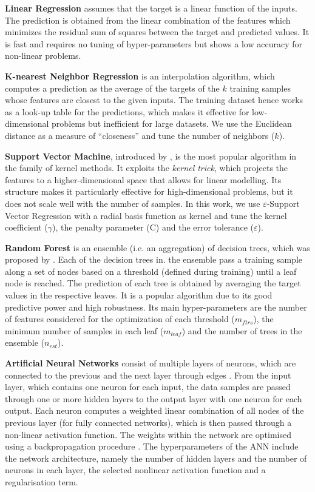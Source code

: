 \textbf{Linear Regression }assumes that the target is a linear function of the inputs. The prediction is obtained from the linear combination of the features which minimizes the residual sum of squares between the target and predicted values. It is fast and requires no tuning of hyper-parameters but shows a low accuracy for non-linear problems.

\textbf{K-nearest Neighbor Regression} is an interpolation algorithm, which computes a prediction as the average of the targets of the $k$ training samples whose features are closest to the given inputs. The training dataset hence works as a look-up table for the predictions, which makes it effective for low-dimensional problems but inefficient for large datasets. We use the Euclidean distance as a measure of “closeness” and tune the number of neighbors ($k$).

\textbf{Support Vector Machine}, introduced by \citet{cortes_support-vector_1995}, is the most popular algorithm in the family of kernel methods. It exploits the \textit{kernel trick}, which projects the features to a higher-dimensional space that allows for linear modelling. Its structure makes it particularly effective for high-dimensional problems, but it does not scale well with the number of samples. In this work, we use $\varepsilon$-Support Vector Regression with a radial basis function as kernel and tune the kernel coefficient ($\gamma$), the penalty parameter (C) and the error tolerance ($\varepsilon$).

\textbf{Random Forest} is an ensemble (i.e. an aggregation) of decision trees, which was proposed by \citet{breiman_random_2001}. Each of the decision trees in. the ensemble pass a training sample along a set of nodes based on a threshold (defined during training) until a leaf node is reached. The prediction of each tree is obtained by averaging the target values in the respective leaves. It is a popular algorithm due to its good predictive power and high robustness. Its main hyper-parameters are the number of features considered for the optimization of each threshold ($m_{ftrs}$), the minimum number of samples in each leaf ($m_{leaf}$) and the number of trees in the ensemble ($n_{est}$).

\textbf{Artificial Neural Networks} consist of multiple layers of neurons, which are connected to the previous and the next layer through edges \cite{rumelhart_learning_1986}. From the input layer, which contains one neuron for each input, the data samples are passed through one or more hidden layers to the output layer with one neuron for each output. Each neuron computes a weighted linear combination of all nodes of the previous layer (for fully connected networks), which is then passed through a non-linear activation function. The weights within the network are optimised using a backpropagation procedure \cite{lecun_efficient_2012}. The hyperparameters of the ANN include the network architecture, namely the number of hidden layers and the number of neurons in each layer, the selected nonlinear activation function and a regularisation term.  

